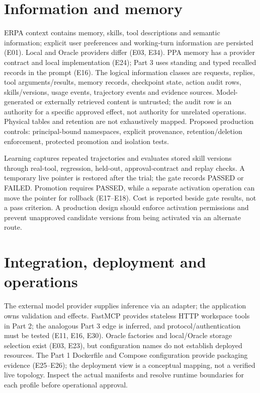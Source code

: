 \documentclass[10pt,letterpaper]{article}
\begin{document}
\section{Information and memory}
ERPA context contains memory, skills, tool descriptions and semantic information; explicit user preferences and working-turn information are persisted (E01). Local and Oracle providers differ (E03, E34). PPA memory has a provider contract and local implementation (E24); Part 3 uses standing and typed recalled records in the prompt (E16). The logical information classes are requests, replies, tool arguments/results, memory records, checkpoint state, action audit rows, skills/versions, usage events, trajectory events and evidence sources. Model-generated or externally retrieved content is untrusted; the audit row is an authority for a specific approved effect, not authority for unrelated operations. Physical tables and retention are not exhaustively mapped. Proposed production controls: principal-bound namespaces, explicit provenance, retention/deletion enforcement, protected promotion and isolation tests.

Learning captures repeated trajectories and evaluates stored skill versions through real-tool, regression, held-out, approval-contract and replay checks. A temporary live pointer is restored after the trial; the gate records PASSED or FAILED. Promotion requires PASSED, while a separate activation operation can move the pointer for rollback (E17--E18). Cost is reported beside gate results, not a pass criterion. A production design should enforce activation permissions and prevent unapproved candidate versions from being activated via an alternate route.
\section{Integration, deployment and operations}
The external model provider supplies inference via an adapter; the application owns validation and effects. FastMCP provides stateless HTTP workspace tools in Part 2; the analogous Part 3 edge is inferred, and protocol/authentication must be tested (E11, E16, E30). Oracle factories and local/Oracle storage selection exist (E03, E23), but configuration names do not establish deployed resources. The Part 1 Dockerfile and Compose configuration provide packaging evidence (E25--E26); the deployment view is a conceptual mapping, not a verified live topology. Inspect the actual manifests and resolve runtime boundaries for each profile before operational approval.
\end{document}
